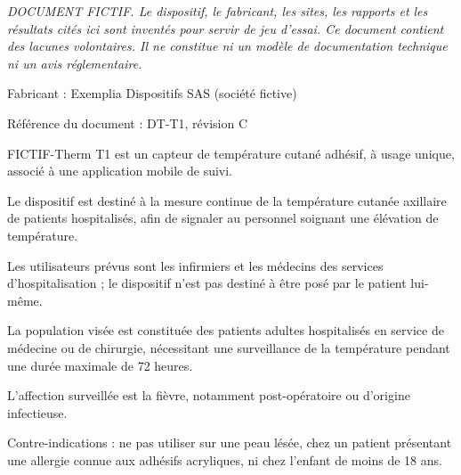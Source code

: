 \documentclass[11pt,a4paper]{article}
\begin{document}
\begin{Form}
{\small\itshape DOCUMENT FICTIF. Le dispositif, le fabricant, les sites, les rapports et les résultats cités ici sont inventés pour servir de jeu d'essai. Ce document contient des lacunes volontaires. Il ne constitue ni un modèle de documentation technique ni un avis réglementaire.}\par

{\small Fabricant : Exemplia Dispositifs SAS (société fictive)}\par
{\small Référence du document : DT-T1, révision C}\par

\par{}\par

\par{}\par

{\small FICTIF-Therm T1 est un capteur de température cutané adhésif, à usage unique, associé à une application mobile de suivi.}\par

{\small Le dispositif est destiné à la mesure continue de la température cutanée axillaire de patients hospitalisés, afin de signaler au personnel soignant une élévation de température.}\par

{\small Les utilisateurs prévus sont les infirmiers et les médecins des services d'hospitalisation ; le dispositif n'est pas destiné à être posé par le patient lui-même.}\par

\par{}\par

{\small La population visée est constituée des patients adultes hospitalisés en service de médecine ou de chirurgie, nécessitant une surveillance de la température pendant une durée maximale de 72 heures.}\par

{\small L'affection surveillée est la fièvre, notamment post-opératoire ou d'origine infectieuse.}\par

{\small Contre-indications : ne pas utiliser sur une peau lésée, chez un patient présentant une allergie connue aux adhésifs acryliques, ni chez l'enfant de moins de 18 ans.}\par


\end{Form}
\end{document}
